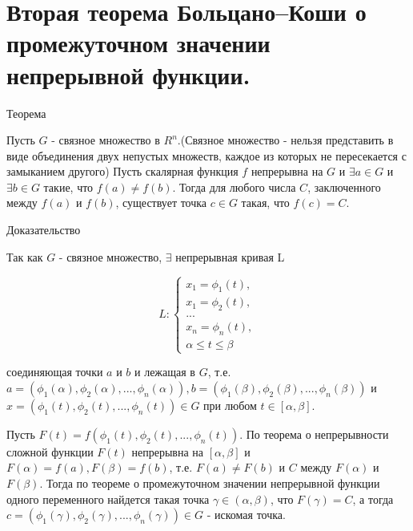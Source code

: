 \section{Вторая теорема Больцано–Коши о промежуточном значении непрерывной функции.}
    
Теорема
    
Пусть $G$ - связное множество в $R^n$.(Связное множество - нельзя представить в виде объединения двух непустых множеств, каждое из которых не пересекается с замыканием другого) Пусть скалярная функция $f$ непрерывна на $G$ и $\exists a \in G$ и $\exists b \in G$ такие, что $f(a) \not= f(b)$. Тогда для любого числа $C$, заключенного между $f(a)$ и $f(b)$, существует точка $c \in G$ такая, что $f(c) = C$.
    
Доказательство
    
Так как $G$ - связное множество, $\exists$ непрерывная кривая L
    
\begin{displaymath}
    L: 
    \begin{cases} 
        x_1 = \phi_1(t), \\ 
        x_1 = \phi_2(t), \\
        ... \\
        x_n = \phi_n(t), \\
        \alpha \leq t \leq \beta
    \end{cases}
\end{displaymath}
    
соединяющая точки $a$ и $b$ и лежащая в $G$, т.е. $a = (\phi_1(\alpha), \phi_2(\alpha), ..., \phi_n(\alpha)), b = (\phi_1(\beta), \phi_2(\beta), ..., \phi_n(\beta))$ и $x = (\phi_1(t), \phi_2(t), ..., \phi_n(t)) \in G$ при любом $t\in [\alpha, \beta]$. 
    
Пусть $F(t) = f(\phi_1(t), \phi_2(t), ..., \phi_n(t))$. По теорема о непрерывности сложной функции $F(t)$ непрерывна на $[\alpha, \beta]$ и $F(\alpha) = f(a), F(\beta) = f(b)$, т.е. $F(a) \not= F(b)$ и $C$ между $F(\alpha)$ и $F(\beta)$. Тогда по теореме о промежуточном значении непрерывной функции одного переменного найдется такая точка $\gamma \in (\alpha, \beta)$, что $F(\gamma) = C$, а тогда $c = (\phi_1(\gamma), \phi_2(\gamma), ..., \phi_n(\gamma)) \in G$ - искомая точка.
